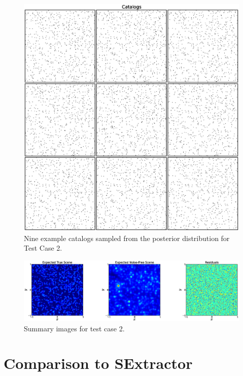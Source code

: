 \documentclass[manuscript]{aastex}
\begin{document}
\begin{figure}
\begin{center}
\includegraphics[scale=0.5]{Figures/catalogs.eps}
\end{center}
\caption{Nine example catalogs sampled from the posterior distribution for
Test Case 2.\label{fig:catalogs}}
\end{figure}

\begin{figure}
\begin{center}
\includegraphics[scale=0.4]{Figures/summaries.eps}
\end{center}
\caption{Summary images for test case 2.\label{fig:summaries}}
\end{figure}

\section{Comparison to SExtractor}
\end{document}
